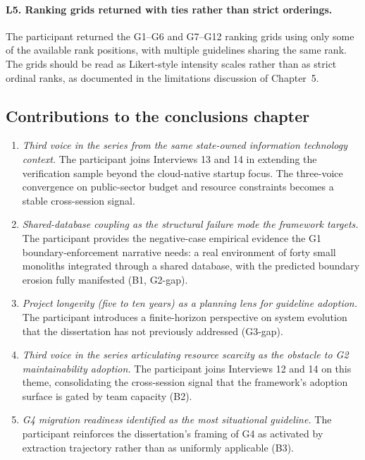 \paragraph*{L5. Ranking grids returned with ties rather than strict orderings.} The participant returned the G1--G6 and G7--G12 ranking grids using only some of the available rank positions, with multiple guidelines sharing the same rank. The grids should be read as Likert-style intensity scales rather than as strict ordinal ranks, as documented in the limitations discussion of Chapter~5.

\subsection*{Contributions to the conclusions chapter}

\begin{enumerate}[itemsep=4pt,topsep=2pt]
  \item \emph{Third voice in the series from the same state-owned information technology context.} The participant joins Interviews 13 and 14 in extending the verification sample beyond the cloud-native startup focus. The three-voice convergence on public-sector budget and resource constraints becomes a stable cross-session signal.
  \item \emph{Shared-database coupling as the structural failure mode the framework targets.} The participant provides the negative-case empirical evidence the G1 boundary-enforcement narrative needs: a real environment of forty small monoliths integrated through a shared database, with the predicted boundary erosion fully manifested (B1, G2-gap).
  \item \emph{Project longevity (five to ten years) as a planning lens for guideline adoption.} The participant introduces a finite-horizon perspective on system evolution that the dissertation has not previously addressed (G3-gap).
  \item \emph{Third voice in the series articulating resource scarcity as the obstacle to G2 maintainability adoption.} The participant joins Interviews 12 and 14 on this theme, consolidating the cross-session signal that the framework's adoption surface is gated by team capacity (B2).
  \item \emph{G4 migration readiness identified as the most situational guideline.} The participant reinforces the dissertation's framing of G4 as activated by extraction trajectory rather than as uniformly applicable (B3).
\end{enumerate}

